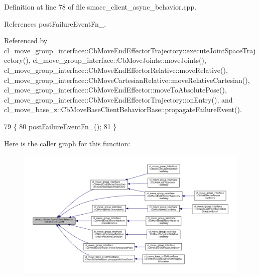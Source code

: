 Definition at line 78 of file smacc\+\_\+client\+\_\+async\+\_\+behavior.\+cpp.



References post\+Failure\+Event\+Fn\+\_\+.



Referenced by cl\+\_\+move\+\_\+group\+\_\+interface\+::\+Cb\+Move\+End\+Effector\+Trajectory\+::execute\+Joint\+Space\+Trajectory(), cl\+\_\+move\+\_\+group\+\_\+interface\+::\+Cb\+Move\+Joints\+::move\+Joints(), cl\+\_\+move\+\_\+group\+\_\+interface\+::\+Cb\+Move\+End\+Effector\+Relative\+::move\+Relative(), cl\+\_\+move\+\_\+group\+\_\+interface\+::\+Cb\+Move\+Cartesian\+Relative\+::move\+Relative\+Cartesian(), cl\+\_\+move\+\_\+group\+\_\+interface\+::\+Cb\+Move\+End\+Effector\+::move\+To\+Absolute\+Pose(), cl\+\_\+move\+\_\+group\+\_\+interface\+::\+Cb\+Move\+End\+Effector\+Trajectory\+::on\+Entry(), and cl\+\_\+move\+\_\+base\+\_\+z\+::\+Cb\+Move\+Base\+Client\+Behavior\+Base\+::propagate\+Failure\+Event().


\begin{DoxyCode}
79     \{
80         \hyperlink{classsmacc_1_1SmaccAsyncClientBehavior_a8041c43a0381f18fae6470a98eb9273d}{postFailureEventFn\_}();
81     \}
\end{DoxyCode}
Here is the caller graph for this function\+:
\nopagebreak
\begin{figure}[H]
\begin{center}
\leavevmode
\includegraphics[width=350pt]{classsmacc_1_1SmaccAsyncClientBehavior_af6fa358cb1ab5ed16791a201f59260e0_icgraph}
\end{center}
\end{figure}
\mbox{\label{classsmacc_1_1SmaccAsyncClientBehavior_adf18efe1f0e4eacc1277b8865a8a94b1}} 
